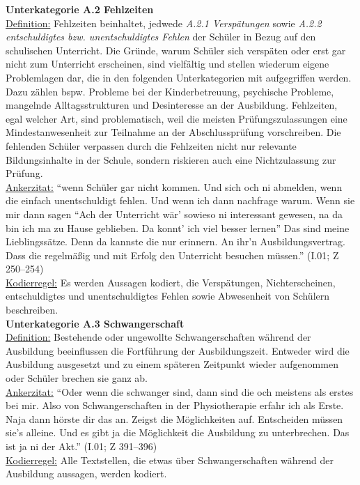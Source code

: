 \noindent
\textbf{Unterkategorie A.2 Fehlzeiten}\\
\underline{Definition:} Fehlzeiten beinhaltet, jedwede \textit{A.2.1 Verspätungen} sowie \textit{A.2.2 entschuldigtes bzw. unentschuldigtes Fehlen} der Schüler in Bezug auf den schulischen Unterricht. Die Gründe, warum Schüler sich verspäten oder erst gar nicht zum Unterricht erscheinen, sind vielfältig und stellen wiederum eigene Problemlagen dar, die in den folgenden Unterkategorien mit aufgegriffen werden. Dazu zählen bspw. Probleme bei der Kinderbetreuung, psychische Probleme, mangelnde Alltagsstrukturen und Desinteresse an der Ausbildung. Fehlzeiten, egal welcher Art, sind problematisch, weil die meisten Prüfungszulassungen eine Mindestanwesenheit zur Teilnahme an der Abschlussprüfung vorschreiben. Die fehlenden Schüler verpassen durch die Fehlzeiten nicht nur relevante Bildungsinhalte in der Schule, sondern riskieren auch eine Nichtzulassung zur Prüfung.\\
\underline{Ankerzitat:} "`wenn Schüler gar nicht kommen. Und sich och ni abmelden, wenn die einfach unentschuldigt fehlen. Und wenn ich dann nachfrage warum. Wenn sie mir dann sagen "`Ach der Unterricht wär' sowieso ni interessant gewesen, na da bin ich ma zu Hause geblieben. Da konnt' ich viel besser lernen"' Das sind meine Lieblingssätze. Denn da kannste die nur erinnern. An ihr'n Ausbildungsvertrag. Dass die regelmäßig und mit Erfolg den Unterricht besuchen müssen."' (I.01; Z 250--254)\\
\underline{Kodierregel:} Es werden Aussagen kodiert, die Verspätungen, Nichterscheinen, entschuldigtes und unentschuldigtes Fehlen sowie Abwesenheit von Schülern beschreiben.\\

\noindent
\textbf{Unterkategorie A.3 Schwangerschaft}\\
\underline{Definition:} Bestehende oder ungewollte Schwangerschaften während der Ausbildung beeinflussen die Fortführung der Ausbildungszeit. Entweder wird die Ausbildung ausgesetzt und zu einem späteren Zeitpunkt wieder aufgenommen oder Schüler brechen sie ganz ab.\\
\underline{Ankerzitat:} "`Oder wenn die schwanger sind, dann sind die och meistens als erstes bei mir. Also von Schwangerschaften in der Physiotherapie erfahr ich als Erste. Naja dann hörste dir das an. Zeigst die Möglichkeiten auf. Entscheiden müssen sie's alleine. Und es gibt ja die Möglichkeit die Ausbildung zu unterbrechen. Das ist ja ni der Akt."' (I.01; Z 391--396)\\
\underline{Kodierregel:} Alle Textstellen, die etwas über Schwangerschaften während der Ausbildung aussagen, werden kodiert.\\


